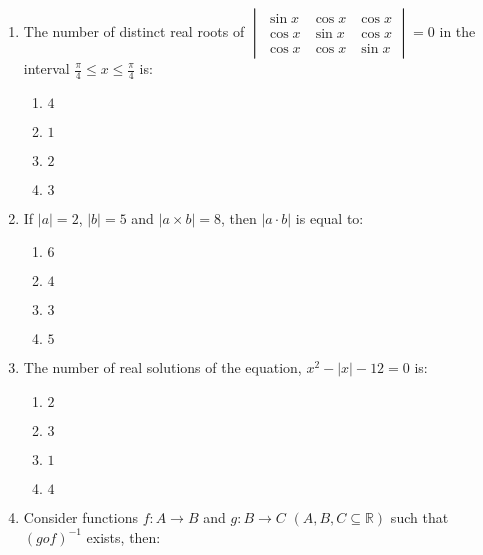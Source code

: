 \documentclass[journal]{IEEEtran}
\newcommand{\brak}[1]{\left( #1 \right)}
\newcommand{\abs}[1]{\left| #1 \right|}
\begin{document}
\begin{enumerate}
    \item The number of distinct real roots of $\begin{vmatrix}\sin x & \cos x & \cos x \\ \cos x & \sin x & \cos x \\ \cos x & \cos x & \sin x\end{vmatrix}=0$ in the interval $\frac{\pi}{4}\le x\le\frac{\pi}{4}$ is:

        \begin{multicols}{4}
        \begin{enumerate}
        \item $4$
        \item $1$
        \item $2$
        \item $3$
        \end{enumerate}
        \end{multicols}

    \item If $\abs{a}=2$, $\abs{b}=5$ and $\abs{a\times b}=8$, then $\abs{a\cdot b}$ is equal to:

        \begin{multicols}{4}
        \begin{enumerate}
        \item $6$
        \item $4$
        \item $3$
        \item $5$
        \end{enumerate}
        \end{multicols}

    \item The number of real solutions of the equation, $x^2-\abs{x}-12=0$ is:

        \begin{multicols}{4}
        \begin{enumerate}
        \item $2$
        \item $3$
        \item $1$
        \item $4$
        \end{enumerate}
        \end{multicols}

    \item Consider functions $f:A\rightarrow B$ and $g:B\rightarrow C$ $\brak{A,B,C\subseteq\mathbb{R}}$ such that $\brak{gof}^{-1}$ exists, then:


\end{enumerate}
\end{document}
